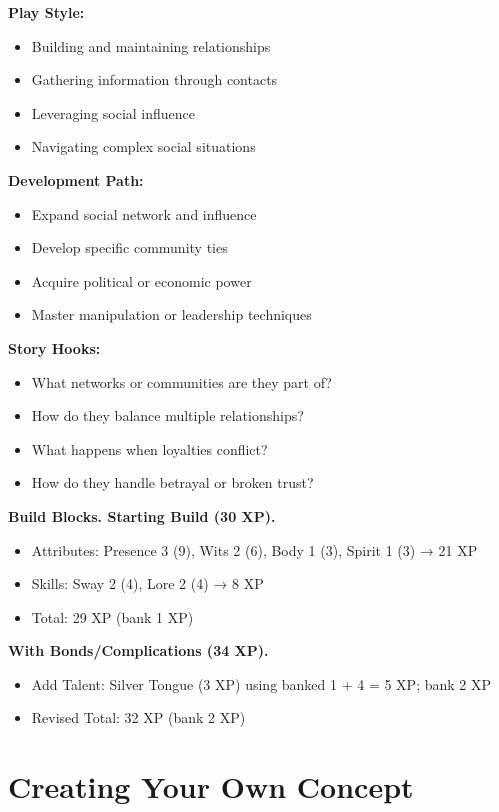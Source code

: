 \documentclass[11pt,twoside,openany]{book}
\begin{document}
\textbf{Play Style:}
\begin{itemize}
\item Building and maintaining relationships
\item Gathering information through contacts
\item Leveraging social influence
\item Navigating complex social situations
\end{itemize}

\textbf{Development Path:}
\begin{itemize}
\item Expand social network and influence
\item Develop specific community ties
\item Acquire political or economic power
\item Master manipulation or leadership techniques
\end{itemize}

\textbf{Story Hooks:}
\begin{itemize}
\item What networks or communities are they part of?
\item How do they balance multiple relationships?
\item What happens when loyalties conflict?
\item How do they handle betrayal or broken trust?
\end{itemize}

\textbf{Build Blocks. Starting Build (30 XP).}
\begin{itemize}
\item Attributes: Presence 3 (9), Wits 2 (6), Body 1 (3), Spirit 1 (3) → 21 XP
\item Skills: Sway 2 (4), Lore 2 (4) → 8 XP
\item Total: 29 XP (bank 1 XP)
\end{itemize}

\textbf{With Bonds/Complications (34 XP).}
\begin{itemize}
\item Add Talent: Silver Tongue (3 XP) using banked 1 + 4 = 5 XP; bank 2 XP
\item Revised Total: 32 XP (bank 2 XP)
\end{itemize}

\section*{Creating Your Own Concept} 
\end{document}
